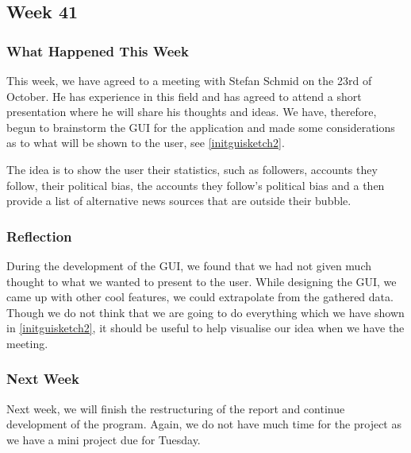 \subsection{Week 41}\label{week41}
\subsubsection{What Happened This Week}
This week, we have agreed to a meeting with Stefan Schmid on the 23rd of
October. He has experience in this field and has agreed to attend a short
presentation where he will share his thoughts and ideas. We have, therefore,
begun to brainstorm the \ac{GUI} for the application and made some
considerations as to what will be shown to the user, see
\autoref{initguisketch2}.\nl


The idea is to show the user their statistics, such as followers, accounts they
follow, their political bias, the accounts they follow's political bias and a
then provide a list of alternative news sources that are outside their bubble.

\subsubsection{Reflection} 
During the development of the \ac{GUI}, we found that we had not given much
thought to what we wanted to present to the user. While designing the \ac{GUI},
we came up with other cool features, we could extrapolate from the gathered
data. Though we do not think that we are going to do everything which we have
shown in \autoref{initguisketch2}, it should be useful to help visualise our idea when
we have the meeting. 

\subsubsection{Next Week}
Next week, we will finish the restructuring of the report and continue
development of the program. Again, we do not have much time for the project as
we have a mini project due for Tuesday.



% 
% 
% 
